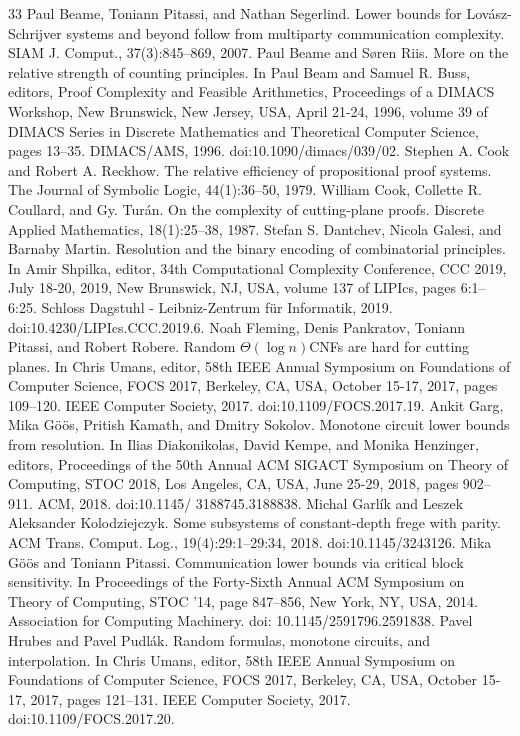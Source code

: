 \documentclass[10pt,a4paper]{article}
\begin{document}
\begin{thebibliography}{33}
 Paul Beame, Toniann Pitassi, and Nathan Segerlind. Lower bounds for Lovász-Schrijver systems and beyond follow from multiparty communication complexity. SIAM J. Comput., 37(3):845–869, 2007.
 Paul Beame and Søren Riis. More on the relative strength of counting principles. In Paul Beam and Samuel R. Buss, editors, Proof Complexity and Feasible Arithmetics, Proceedings of a DIMACS Workshop, New Brunswick, New Jersey, USA, April 21-24, 1996, volume 39 of DIMACS Series in Discrete Mathematics and Theoretical Computer Science, pages 13–35. DIMACS/AMS, 1996. doi:10.1090/dimacs/039/02.
 Stephen A. Cook and Robert A. Reckhow. The relative efficiency of propositional proof systems. The Journal of Symbolic Logic, 44(1):36–50, 1979.
 William Cook, Collette R. Coullard, and Gy. Turán. On the complexity of cutting-plane proofs. Discrete Applied Mathematics, 18(1):25–38, 1987.
 Stefan S. Dantchev, Nicola Galesi, and Barnaby Martin. Resolution and the binary encoding of combinatorial principles. In Amir Shpilka, editor, 34th Computational Complexity Conference, CCC 2019, July 18-20, 2019, New Brunswick, NJ, USA, volume 137 of LIPIcs, pages 6:1–6:25. Schloss Dagstuhl - Leibniz-Zentrum für Informatik, 2019. doi:10.4230/LIPIcs.CCC.2019.6.
 Noah Fleming, Denis Pankratov, Toniann Pitassi, and Robert Robere. Random $\Theta(\log n)$CNFs are hard for cutting planes. In Chris Umans, editor, 58th IEEE Annual Symposium on Foundations of Computer Science, FOCS 2017, Berkeley, CA, USA, October 15-17, 2017, pages 109–120. IEEE Computer Society, 2017. doi:10.1109/FOCS.2017.19.
 Ankit Garg, Mika Göös, Pritish Kamath, and Dmitry Sokolov. Monotone circuit lower bounds from resolution. In Ilias Diakonikolas, David Kempe, and Monika Henzinger, editors, Proceedings of the 50th Annual ACM SIGACT Symposium on Theory of Computing, STOC 2018, Los Angeles, CA, USA, June 25-29, 2018, pages 902–911. ACM, 2018. doi:10.1145/ 3188745.3188838.
 Michal Garlík and Leszek Aleksander Kolodziejczyk. Some subsystems of constant-depth frege with parity. ACM Trans. Comput. Log., 19(4):29:1–29:34, 2018. doi:10.1145/3243126.
 Mika Göös and Toniann Pitassi. Communication lower bounds via critical block sensitivity. In Proceedings of the Forty-Sixth Annual ACM Symposium on Theory of Computing, STOC ’14, page 847–856, New York, NY, USA, 2014. Association for Computing Machinery. doi: 10.1145/2591796.2591838.
 Pavel Hrubes and Pavel Pudlák. Random formulas, monotone circuits, and interpolation. In Chris Umans, editor, 58th IEEE Annual Symposium on Foundations of Computer Science, FOCS 2017, Berkeley, CA, USA, October 15-17, 2017, pages 121–131. IEEE Computer Society, 2017. doi:10.1109/FOCS.2017.20.

\end{thebibliography}
\end{document}
